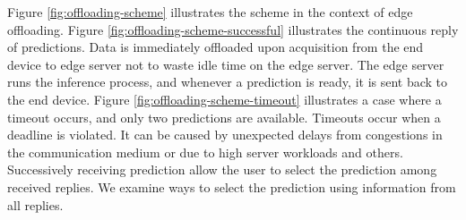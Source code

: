 Figure \ref{fig:offloading-scheme} illustrates the scheme in the context of edge offloading. Figure \ref{fig:offloading-scheme-successful} illustrates the continuous reply of predictions. Data is immediately offloaded upon acquisition from the end device to edge server not to waste idle time on the edge server. The edge server runs the inference process, and whenever a prediction is ready, it is sent back to the end device. Figure \ref{fig:offloading-scheme-timeout} illustrates a case where a timeout occurs, and only two predictions are available. Timeouts occur when a deadline is violated. It can be caused by unexpected delays from congestions in the communication medium or due to high server workloads and others. Successively receiving prediction allow the user to select the prediction among received replies. We examine ways to select the prediction using information from all replies.
